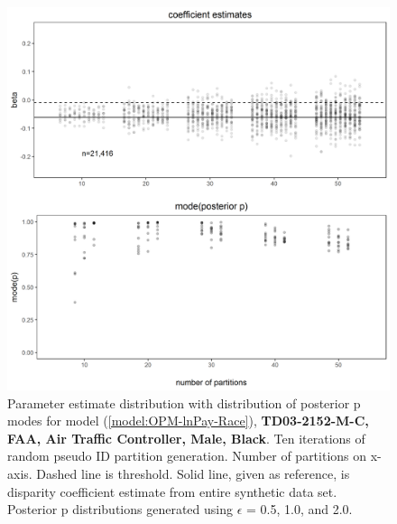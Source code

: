 \documentclass[10pt, letterpaper]{article}
\begin{document}
\begin{spacing}{1.0}
\begin{figure}[]
    \centering
    \includegraphics[width=6in]{images/RacePayDifferentialBetaWithPosteriorDistribution-TD03-2152-M-C.png}
    \caption{Parameter estimate distribution with distribution of posterior p modes for model (\ref{model:OPM-lnPay-Race}), \textbf{TD03-2152-M-C, FAA, Air Traffic Controller, Male, Black}.  Ten iterations of random pseudo ID partition generation.  Number of partitions on x-axis.  Dashed line is threshold.  Solid line, given as reference, is disparity coefficient estimate from entire synthetic data set.  Posterior p distributions generated using $\epsilon$ = 0.5, 1.0, and 2.0.}
    \label{figure:RacePayDifferentialBetaWithPosteriorDistribution-TD03-2152-M-C}
\end{figure}

\clearpage


\end{spacing}
\end{document}
